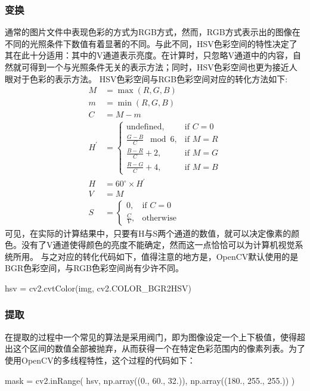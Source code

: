 \subsubsection{变换}
通常的图片文件中表现色彩的方式为RGB方式，然而，RGB方式表示出的图像在不同的光照条件下数值有着显著的不同。与此不同，HSV色彩空间的特性决定了其在此十分适用：其中的V通道表示亮度。在计算时，只忽略V通道中的内容，自然就可得到一个与光照条件无关的表示方法；同时，HSV色彩空间也更为接近人眼对于色彩的表示方法。
HSV色彩空间与RGB色彩空间对应的转化方法如下:\\
\begin{align}
  M &= \operatorname{max}(R, G, B) \\
  m &= \operatorname{min}(R, G, B) \\
  C &= M - m\\
  H^\prime &=
    \begin{cases}
      \mathrm{undefined},        &\mbox{if } C = 0 \\
      \frac{G - B}{C} \;\bmod 6, &\mbox{if } M = R \\
      \frac{B - R}{C} + 2,       &\mbox{if } M = G \\
      \frac{R - G}{C} + 4,       &\mbox{if } M = B
    \end{cases} \\
  H        &= 60^\circ \times H^\prime\\
  V &= M\\
   S &=
    \begin{cases}
      0,           &\mbox{if } C = 0 \\
      \frac{C}{V}, &\mbox{otherwise}
    \end{cases}
\end{align}
可见，在实际的计算结果中，只要有H与S两个通道的数值，就可以决定像素的颜色。没有了V通道使得颜色的亮度不能确定，然而这一点恰恰可以为计算机视觉系统所用。
与之对应的转化代码如下，值得注意的地方是，OpenCV默认使用的是BGR色彩空间，与RGB色彩空间尚有少许不同。
\begin{python}
hsv = cv2.cvtColor(img, cv2.COLOR_BGR2HSV)
\end{python}
\subsubsection{提取}

在提取的过程中一个常见的算法是采用阀门，即为图像设定一个上下极值，使得超出这个区间的数值全部被抛弃，从而获得一个在特定色彩范围内的像素列表。为了使用OpenCV的多线程特性，这个过程的代码如下：
\begin{python}
mask = cv2.inRange( hsv, 
                    np.array((0., 60., 32.)), 
                    np.array((180., 255., 255.))
                    )
\end{python}

